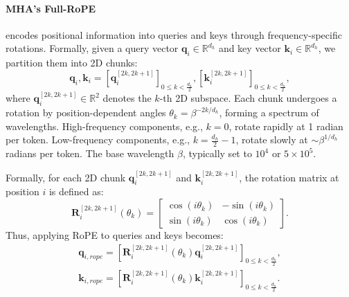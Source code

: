 \paragraph{MHA's Full-RoPE} encodes positional information into queries and keys through frequency-specific rotations. Formally, given a query vector \(\bm{q}_i \in \mathbb{R}^{d_h}\) and key vector \(\bm{k}_i \in \mathbb{R}^{d_h}\), we partition them into 2D chunks:  
\[
\bm{q}_i,\bm{k}_i = \left[\bm{q}_i^{[2k, 2k+1]}\right]_{0 \leq k < \frac{d_h}{2}}, \left[\bm{k}_i^{[2k, 2k+1]}\right]_{0 \leq k < \frac{d_h}{2}},
\]  
where \(\bm{q}_i^{[2k, 2k+1]} \in \mathbb{R}^2\) denotes the \(k\)-th 2D subspace. Each chunk undergoes a rotation by position-dependent angles \(\theta_k = \beta^{-2k/{d_h}}\), forming a spectrum of wavelengths.
High-frequency components, e.g., $k=0$, rotate rapidly at 1 radian per token.  
Low-frequency components, e.g., $k=\frac{d_h}{2}-1$, rotate slowly at \(\sim \beta^{1/d_h}\) radians per token.  
The base wavelength \(\beta\), typically set to \(10^4\) \cite{journals/ijon/SuALPBL24} or \(5\!\times\!10^5\).



Formally, for each 2D chunk \( \bm{q}_i^{[2k, 2k+1]} \) and \( \bm{k}_i^{[2k, 2k+1]} \), the rotation matrix at position \( i \) is defined as:  
\[
\bm{R}_i^{[2k, 2k+1]}(\theta_k) = 
\begin{bmatrix} 
\cos(i\theta_k) & -\sin(i\theta_k) \\ 
\sin(i\theta_k) & \cos(i\theta_k) 
\end{bmatrix}.
\]  
Thus, applying RoPE to queries and keys becomes:  
\begin{align*}
\bm{q}_{i, rope} = \left[\bm{R}_i^{[2k, 2k+1]}(\theta_k)\bm{q}_i^{[2k, 2k+1]}\right]_{0 \leq k < \frac{d_h}{2}},  \\
\bm{k}_{i, rope} = \left[\bm{R}_i^{[2k, 2k+1]}(\theta_k)\bm{k}_i^{[2k, 2k+1]}\right]_{0 \leq k < \frac{d_h}{2}}.
\end{align*}

